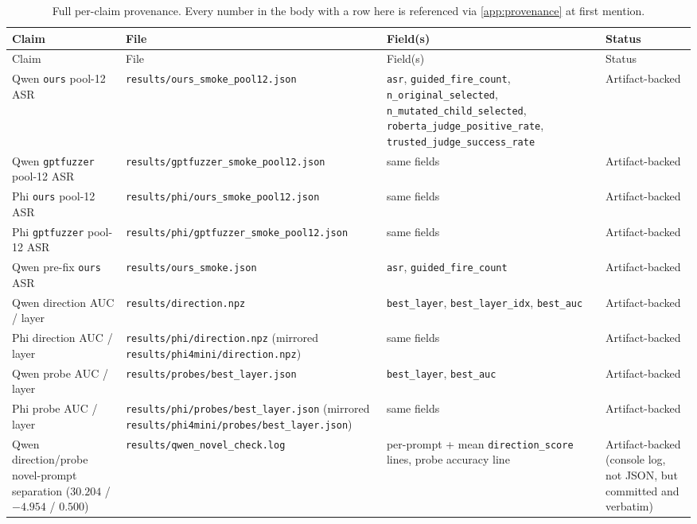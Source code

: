\documentclass[11pt,letterpaper]{article}
\begin{document}
\begin{longtable}{p{3.6cm} p{4.7cm} p{4.2cm} p{2.6cm}}
\caption{Full per-claim provenance. Every number in the body with a row here is referenced via
  \cref{app:provenance} at first mention.}
\label{tab:provenance} \\
\toprule
Claim & File & Field(s) & Status \\
\midrule
\endfirsthead
\toprule
Claim & File & Field(s) & Status \\
\midrule
\endhead
\bottomrule
\endfoot
Qwen \texttt{ours} pool-12 ASR & \texttt{results/ours\_smoke\_pool12.json} &
  \texttt{asr}, \texttt{guided\_fire\_count}, \texttt{n\_original\_selected},
  \texttt{n\_mutated\_child\_selected}, \texttt{roberta\_judge\_positive\_rate},
  \texttt{trusted\_judge\_success\_rate} & Artifact-backed \\
Qwen \texttt{gptfuzzer} pool-12 ASR & \texttt{results/gptfuzzer\_smoke\_pool12.json} &
  same fields & Artifact-backed \\
Phi \texttt{ours} pool-12 ASR & \texttt{results/phi/ours\_smoke\_pool12.json} &
  same fields & Artifact-backed \\
Phi \texttt{gptfuzzer} pool-12 ASR & \texttt{results/phi/gptfuzzer\_smoke\_pool12.json} &
  same fields & Artifact-backed \\
Qwen pre-fix \texttt{ours} ASR & \texttt{results/ours\_smoke.json} &
  \texttt{asr}, \texttt{guided\_fire\_count} & Artifact-backed \\
Qwen direction AUC / layer & \texttt{results/direction.npz} &
  \texttt{best\_layer}, \texttt{best\_layer\_idx}, \texttt{best\_auc} & Artifact-backed \\
Phi direction AUC / layer & \texttt{results/phi/direction.npz} (mirrored
  \texttt{results/phi4mini/direction.npz}) & same fields & Artifact-backed \\
Qwen probe AUC / layer & \texttt{results/probes/best\_layer.json} &
  \texttt{best\_layer}, \texttt{best\_auc} & Artifact-backed \\
Phi probe AUC / layer & \texttt{results/phi/probes/best\_layer.json} (mirrored
  \texttt{results/phi4mini/probes/best\_layer.json}) & same fields & Artifact-backed \\
Qwen direction/probe novel-prompt separation ($30.204$ / $-4.954$ / $0.500$) &
  \texttt{results/qwen\_novel\_check.log} & per-prompt + mean \texttt{direction\_score}
  lines, probe accuracy line & Artifact-backed (console log, not JSON, but committed and
  verbatim) \\

\end{longtable}
\end{document}
